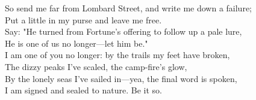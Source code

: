 \begin{poemblock}
So send me far from Lombard Street, and write me down a failure;\\
\idt Put a little in my purse and leave me free.\\
Say: "He turned from Fortune's offering to follow up a pale lure,\\
\idt He is one of us no longer—let him be."\\
I am one of you no longer: by the trails my feet have broken,\\
\idt The dizzy peaks I've scaled, the camp-fire's glow,\\
By the lonely seas I've sailed in—yea, the final word is spoken,\\
\idt I am signed and sealed to nature. Be it so.
\end{poemblock}
